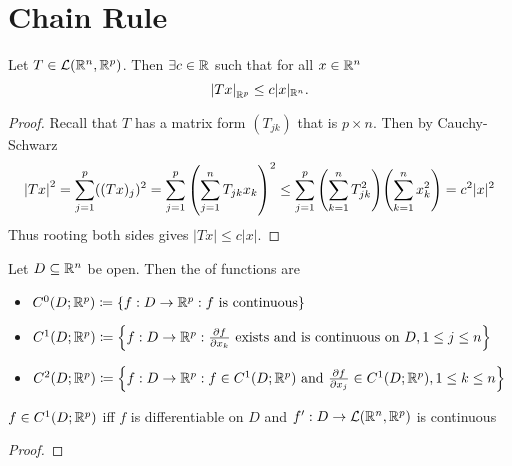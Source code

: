 \documentclass[../main.tex]{subfiles}
\begin{document}
\section{Chain Rule}

\begin{theorem}
    \label{thm:linearboundedness}
    Let $T \in \mathcal{L}(\mathbb{R}^n, \mathbb{R}^p)$. Then $\exists c \in \mathbb{R}$ such that for all $x \in \mathbb{R}^n$
    \[
        \qty|Tx|_{\mathbb{R}^p} \leq c|x|_{\mathbb{R}^n}
    .\]
\end{theorem}

\begin{proof}
    Recall that $T$ has a matrix form $(T_{jk})$ that is $p \times n$. Then by Cauchy-Schwarz
    \[
        \qty|Tx|^2 = \sum_{j=1}^p ((Tx)_j)^2 = \sum_{j=1}^p \qty(\sum_{j=1}^n T_{jk} x_k)^2 \leq \sum_{j=1}^p \qty(\sum_{k=1}^n T_{jk}^2) \qty(\sum_{k=1}^n x_k^2) = c^2 |x|^2
    \]
    Thus rooting both sides gives $|Tx| \leq c |x|$.
\end{proof}

\begin{definition}
    Let $D \subseteq \mathbb{R}^n$ be open. Then the  of functions are
    \begin{itemize}
        \item $C^0 (D; \mathbb{R}^p) \coloneq \qty{ f : D \to \mathbb{R}^p : \text{$f$ is continuous}}$
        \item $C^1 (D; \mathbb{R}^p) \coloneq \qty{ f : D \to \mathbb{R}^p : \pdv{f}{x_k}\text{ exists and is continuous on } D, 1 \leq j \leq n}$
        \item $C^2 (D; \mathbb{R}^p) \coloneq \qty{ f : D \to \mathbb{R}^p : f \in C^1(D; \mathbb{R}^p) \text{ and } \pdv{f}{x_j} \in C^1(D; \mathbb{R}^p), 1 \leq k \leq n}$
    \end{itemize}
\end{definition}

\begin{theorem}
$f \in C^1(D; \mathbb{R}^p)$ iff $f$ is differentiable on $D$ and $f' : D \to \mathcal{L}(\mathbb{R}^n, \mathbb{R}^p)$ is continuous
\end{theorem}

\begin{proof}
\end{proof}
\end{document}
